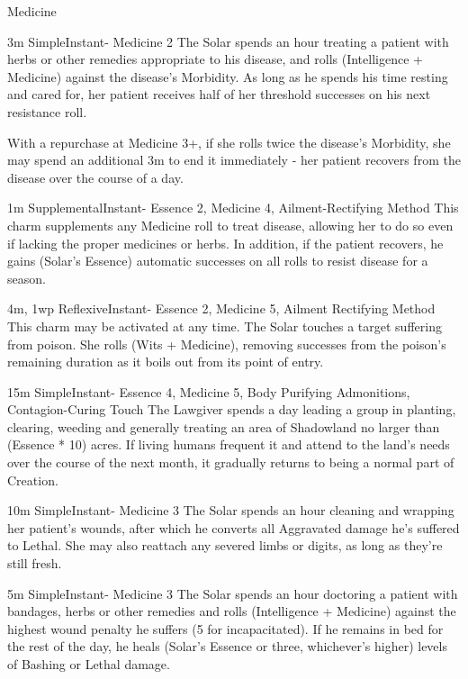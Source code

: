 \begin{Ability}{Medicine}

  {3m}
  {Simple}{Instant}{-}
  {Medicine 2}
  The Solar spends an hour treating a patient with herbs or other remedies appropriate to his disease, and rolls (Intelligence + Medicine) against the disease's Morbidity. As long as he spends his time resting and cared for, her patient receives half of her threshold successes on his next resistance roll.

  With a repurchase at Medicine 3+, if she rolls twice the disease's Morbidity, she may spend an additional 3m to end it immediately - her patient recovers from the disease over the course of a day.

  {1m}
  {Supplemental}{Instant}{-}
  {Essence 2, Medicine 4, Ailment-Rectifying Method}
  This charm supplements any Medicine roll to treat disease, allowing her to do so even if lacking the proper medicines or herbs. In addition, if the patient recovers, he gains (Solar's Essence) automatic successes on all rolls to resist disease for a season.

  {4m, 1wp}
  {Reflexive}{Instant}{-}
  {Essence 2, Medicine 5, Ailment Rectifying Method}
  This charm may be activated at any time. The Solar touches a target suffering from poison. She rolls (Wits + Medicine), removing successes from the poison's remaining duration as it boils out from its point of entry.

  {15m}
  {Simple}{Instant}{-}
  {Essence 4, Medicine 5, Body Purifying Admonitions, Contagion-Curing Touch}
  The Lawgiver spends a day leading a group in planting, clearing, weeding and generally treating an area of Shadowland no larger than (Essence * 10) acres. If living humans frequent it and attend to the land's needs over the course of the next month, it gradually returns to being a normal part of Creation.

  {10m}
  {Simple}{Instant}{-}
  {Medicine 3}
  The Solar spends an hour cleaning and wrapping her patient's wounds, after which he converts all Aggravated damage he's suffered to Lethal. She may also reattach any severed limbs or digits, as long as they're still fresh.

  {5m}
  {Simple}{Instant}{-}
  {Medicine 3}
  The Solar spends an hour doctoring a patient with bandages, herbs or other remedies and rolls (Intelligence + Medicine) against the highest wound penalty he suffers (5 for incapacitated). If he remains in bed for the rest of the day, he heals (Solar's Essence or three, whichever's higher) levels of Bashing or Lethal damage.


\end{Ability}
